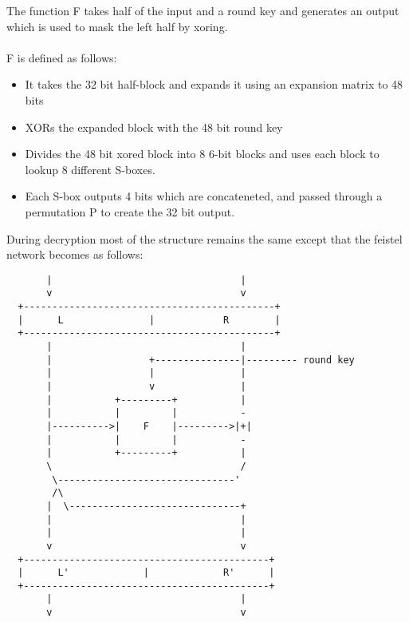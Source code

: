 \documentclass{article}
\begin{document}
The function F takes half of the input and a round key and generates an output which is used to mask the left half by xoring.\\\\
F is defined as follows:\\
\begin{itemize}
\item It takes the 32 bit half-block and expands it using an expansion matrix to 48 bits
\item XORs the expanded block with the 48 bit round key
\item Divides the 48 bit xored block into 8 6-bit blocks and uses each block to lookup 8 different S-boxes.
\item Each S-box outputs 4 bits which are concateneted, and passed through a permutation P to create the 32 bit output.
\end{itemize}

During decryption most of the structure remains the same except that the feistel network becomes as follows:

\small
\begin{verbatim}
       |                                 |
       v                                 v
  +--------------------------------------------+
  |      L               |            R        |
  +--------------------------------------------+
       |                                 |
       |                 +---------------|--------- round key
       |                 |               |
       |                 v               |
       |           +---------+           |
       |           |         |           -
       |---------->|    F    |--------->|+|
       |           |         |           -
       |           +---------+           |
       \                                 /
        \-------------------------------'
        /\ 
       |  \------------------------------+
       |                                 |
       |                                 |
       v                                 v
  +-------------------------------------------+
  |      L'             |             R'      |
  +-------------------------------------------+
       |                                 |
       v                                 v
\end{verbatim}
\normalsize
\end{document}
